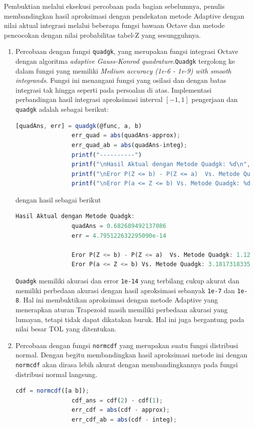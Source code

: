 \documentclass[journal,12pt,onecolumn,a4paper]{IEEEtran}
\begin{document}
Pembuktian melalui eksekusi percobaan pada bagian sebelumnya, penulis membandingkan hasil aproksimasi dengan pendekatan metode Adaptive dengan nilai aktual integrasi melalui beberapa fungsi bawaan Octave dan metode pencocokan dengan nilai probabilitas tabel-Z yang sesungguhnya.
\begin{enumerate}
	\item
	      Percobaan dengan fungsi \lstinline{quadgk}, yang merupakan fungsi integrasi Octave dengan algoritma \emph{adaptive Gauss-Konrod quadrature}.\lstinline{Quadgk} tergolong ke dalam fungsi yang memiliki \emph{Medium accuracy (1e-6 - 1e-9) with smooth integrands}. Fungsi ini menangani fungsi yang osilasi dan dengan batas integrasi tak hingga seperti pada persoalan di atas. Implementasi perbandingan hasil integrasi aproksimasi interval \([-1,1]\) pengerjaan dan \lstinline{quadgk} adalah sebagai berikut:

	      \begin{lstlisting}[language=Octave]
				[quadAns, err] = quadgk(@func, a, b)
				err_quad = abs(quadAns-approx);
				err_quad_ab = abs(quadAns-integ);
				printf("----------")
				printf("\nHasil Aktual dengan Metode Quadgk: %d\n", quadAns)
				printf("\nEror P(Z <= b) - P(Z <= a)  Vs. Metode Quadgk: %d\n", err_quad)
				printf("\nEror P(a <= Z <= b) Vs. Metode Quadgk: %d\n", err_quad_ab)
			\end{lstlisting}

	      dengan hasil sebagai berikut

	      \begin{lstlisting}[language=Octave]
				Hasil Aktual dengan Metode Quadgk: 
				quadAns = 0.682689492137086
				err = 4.795122632295090e-14  
		
				Eror P(Z <= b) - P(Z <= a)  Vs. Metode Quadgk: 1.123183701601249e-08
				Eror P(a <= Z <= b) Vs. Metode Quadgk: 3.181731833556967e-07
			\end{lstlisting}

	      \lstinline{Quadgk} memiliki akurasi dan error \lstinline{1e-14} yang terbilang cukup akurat dan memiliki perbedaan akurasi dengan hasil aproksimasi sebanyak \lstinline{1e-7} dan \lstinline{1e-8}. Hal ini membuktikan aproksimasi dengan metode Adaptive yang menerapkan aturan Trapezoid masih memiliki perbedaan akurasi yang lumayan, tetapi tidak dapat dikatakan buruk. Hal ini juga bergantung pada nilai besar TOL yang ditentukan.

	\item
	      Percobaan dengan fungsi \lstinline{normcdf} yang merupakan suatu fungsi distribusi normal. Dengan begitu membandingkan hasil aproksimasi metode ini dengan \lstinline{normcdf} akan dirasa lebih akurat dengan membandingkannya pada fungsi distribusi normal langsung.
	      \begin{lstlisting}[language=Octave]
				cdf = normcdf([a b]);
				cdf_ans = cdf(2) - cdf(1);
				err_cdf = abs(cdf - approx);
				err_cdf_ab = abs(cdf - integ);


\end{lstlisting}
\end{enumerate}
\end{document}
